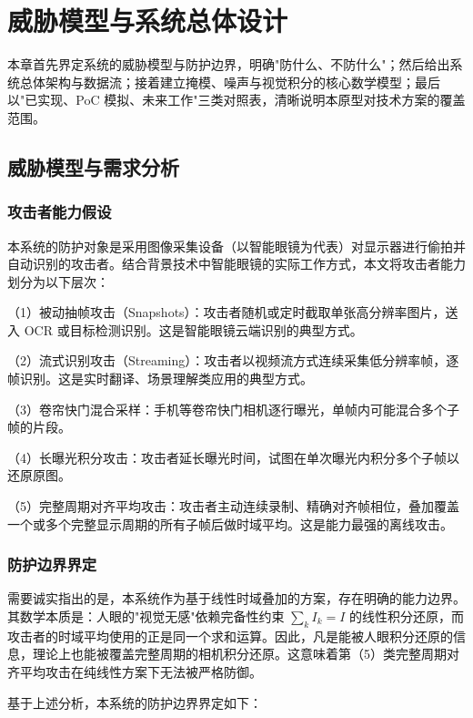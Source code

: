 \chapter{威胁模型与系统总体设计}

本章首先界定系统的威胁模型与防护边界，明确"防什么、不防什么"；然后给出系统总体架构与数据流；接着建立掩模、噪声与视觉积分的核心数学模型；最后以"已实现、PoC 模拟、未来工作"三类对照表，清晰说明本原型对技术方案的覆盖范围。

\section{威胁模型与需求分析}

\subsection{攻击者能力假设}

本系统的防护对象是采用图像采集设备（以智能眼镜为代表）对显示器进行偷拍并自动识别的攻击者。结合背景技术中智能眼镜的实际工作方式，本文将攻击者能力划分为以下层次：

（1）被动抽帧攻击（Snapshots）：攻击者随机或定时截取单张高分辨率图片，送入 OCR 或目标检测识别。这是智能眼镜云端识别的典型方式。

（2）流式识别攻击（Streaming）：攻击者以视频流方式连续采集低分辨率帧，逐帧识别。这是实时翻译、场景理解类应用的典型方式。

（3）卷帘快门混合采样：手机等卷帘快门相机逐行曝光，单帧内可能混合多个子帧的片段。

（4）长曝光积分攻击：攻击者延长曝光时间，试图在单次曝光内积分多个子帧以还原原图。

（5）完整周期对齐平均攻击：攻击者主动连续录制、精确对齐帧相位，叠加覆盖一个或多个完整显示周期的所有子帧后做时域平均。这是能力最强的离线攻击。

\subsection{防护边界界定}

需要诚实指出的是，本系统作为基于线性时域叠加的方案，存在明确的能力边界。其数学本质是：人眼的"视觉无感"依赖完备性约束 $\sum_k I_k = I$ 的线性积分还原，而攻击者的时域平均使用的正是同一个求和运算。因此，凡是能被人眼积分还原的信息，理论上也能被覆盖完整周期的相机积分还原。这意味着第（5）类完整周期对齐平均攻击在纯线性方案下无法被严格防御。

基于上述分析，本系统的防护边界界定如下：

